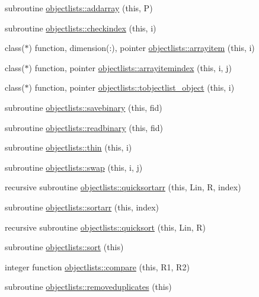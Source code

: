 \begin{DoxyCompactItemize}
\item 
subroutine \mbox{\hyperlink{namespaceobjectlists_aff0d8c1f6bf740fa33ba6c02cca08daf}{objectlists\+::addarray}} (this, P)
\item 
subroutine \mbox{\hyperlink{namespaceobjectlists_aff0608d072ab891a55072d2afde0b978}{objectlists\+::checkindex}} (this, i)
\item 
class($\ast$) function, dimension(\+:), pointer \mbox{\hyperlink{namespaceobjectlists_a72ee9292ce07a71798b7b6ac5b3cb6c3}{objectlists\+::arrayitem}} (this, i)
\item 
class($\ast$) function, pointer \mbox{\hyperlink{namespaceobjectlists_aef8a1d27db060a7e7289e5ee3849ce21}{objectlists\+::arrayitemindex}} (this, i, j)
\item 
class($\ast$) function, pointer \mbox{\hyperlink{namespaceobjectlists_a9a1de7415648fec93d3d27e8b3ad053f}{objectlists\+::tobjectlist\+\_\+object}} (this, i)
\item 
subroutine \mbox{\hyperlink{namespaceobjectlists_abbc4a249efcc68f87936eb7e93ecffaf}{objectlists\+::savebinary}} (this, fid)
\item 
subroutine \mbox{\hyperlink{namespaceobjectlists_a68cfe6fa523fb21df53a6f58e5fb498e}{objectlists\+::readbinary}} (this, fid)
\item 
subroutine \mbox{\hyperlink{namespaceobjectlists_a48d7726bdf69ff2b7cb84d89d12af19d}{objectlists\+::thin}} (this, i)
\item 
subroutine \mbox{\hyperlink{namespaceobjectlists_afbb87b678b2aa36260efbc57bb11a45b}{objectlists\+::swap}} (this, i, j)
\item 
recursive subroutine \mbox{\hyperlink{namespaceobjectlists_a663520be1986351d7c16a9fccb40b6e8}{objectlists\+::quicksortarr}} (this, Lin, R, index)
\item 
subroutine \mbox{\hyperlink{namespaceobjectlists_af5166a7a14ff75eca5eda21a454fe2a2}{objectlists\+::sortarr}} (this, index)
\item 
recursive subroutine \mbox{\hyperlink{namespaceobjectlists_a3000970aec60eac0c74b465332a4fca2}{objectlists\+::quicksort}} (this, Lin, R)
\item 
subroutine \mbox{\hyperlink{namespaceobjectlists_ab62cea139392ebee550346a3f36a8448}{objectlists\+::sort}} (this)
\item 
integer function \mbox{\hyperlink{namespaceobjectlists_a05b2014389dbbc09da541c24912141f8}{objectlists\+::compare}} (this, R1, R2)
\item 
subroutine \mbox{\hyperlink{namespaceobjectlists_af660367ba45ff04c784f5ea3c01560ea}{objectlists\+::removeduplicates}} (this)

\end{DoxyCompactItemize}
